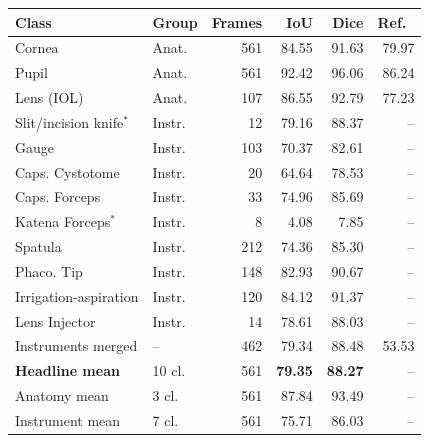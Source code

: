 \begin{tabular}{@{}llrrrr@{}}
\toprule
Class & Group & Frames & IoU & Dice & Ref.~\cite{ghamsarian2024cataract} \\
\midrule
Cornea & Anat. & 561 & 84.55 & 91.63 & 79.97 \\
Pupil & Anat. & 561 & 92.42 & 96.06 & 86.24 \\
Lens (IOL) & Anat. & 107 & 86.55 & 92.79 & 77.23 \\
Slit/incision knife$^\ast$ & Instr. & 12 & 79.16 & 88.37 & -- \\
Gauge & Instr. & 103 & 70.37 & 82.61 & -- \\
Caps. Cystotome & Instr. & 20 & 64.64 & 78.53 & -- \\
Caps. Forceps & Instr. & 33 & 74.96 & 85.69 & -- \\
Katena Forceps$^\ast$ & Instr. & 8 & 4.08 & 7.85 & -- \\
Spatula & Instr. & 212 & 74.36 & 85.30 & -- \\
Phaco. Tip & Instr. & 148 & 82.93 & 90.67 & -- \\
Irrigation-aspiration & Instr. & 120 & 84.12 & 91.37 & -- \\
Lens Injector & Instr. & 14 & 78.61 & 88.03 & -- \\
\midrule
Instruments merged & -- & 462 & 79.34 & 88.48 & 53.53 \\
\midrule
\textbf{Headline mean} & 10 cl. & 561 & \textbf{79.35} & \textbf{88.27} & -- \\
Anatomy mean & 3 cl. & 561 & 87.84 & 93.49 & -- \\
Instrument mean & 7 cl. & 561 & 75.71 & 86.03 & -- \\
\bottomrule
\end{tabular}
